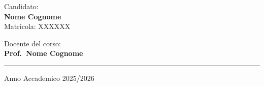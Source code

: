 \documentclass[11pt, a4paper]{article}
\newcommand{\AnnoAccademico}{Anno Accademico 2025/2026}
\newcommand{\NomeAutore}{Nome Cognome}
\newcommand{\MatricolaAutore}{Matricola: XXXXXX}
\newcommand{\NomeDocente}{Prof.\ Nome Cognome}
\begin{document}
\begin{titlepage}
  \vfill

  \begin{minipage}[t]{0.46\textwidth}
    \raggedright
    {\small Candidato:}\\[0.25em]
    {\large\bfseries\NomeAutore}\\[0.15em]
    {\small\MatricolaAutore}
  \end{minipage}
  \hfill
  \begin{minipage}[t]{0.46\textwidth}
    \raggedleft
    {\small Docente del corso:}\\[0.25em]
    {\large\bfseries\NomeDocente}
  \end{minipage}

  \vspace{1.2cm}
  \rule{\textwidth}{0.4pt}
  \vspace{0.35cm}
  {\normalsize\AnnoAccademico\par}
\end{titlepage}

\tableofcontents
\vspace{0.8cm}
\listoffigures
\vspace{0.6cm}
\listoftables
\clearpage



\clearpage


\clearpage


\clearpage


\clearpage

\printbibliography[title={Bibliografia}]
\end{document}
